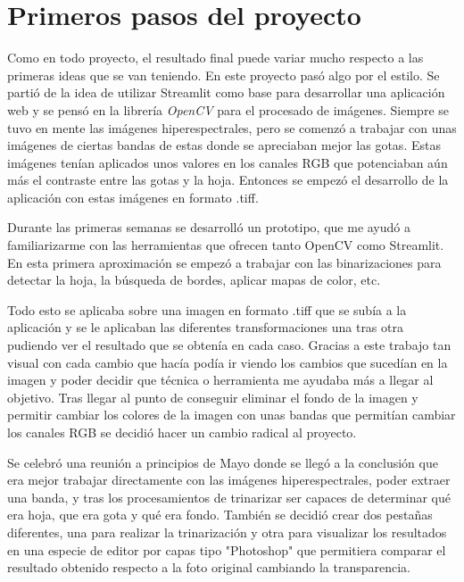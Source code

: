 
\section{Primeros pasos del proyecto}
Como en todo proyecto, el resultado final puede variar mucho respecto a las primeras ideas que se van teniendo. En este proyecto pasó algo por el estilo. Se partió de la idea de utilizar Streamlit como base para desarrollar una aplicación web y se pensó en la librería \textit{OpenCV} para el procesado de imágenes. Siempre se tuvo en mente las imágenes hiperespectrales, pero se comenzó a trabajar con unas imágenes de ciertas bandas de estas donde se apreciaban mejor las gotas. Estas imágenes tenían aplicados unos valores en los canales RGB que potenciaban aún más el contraste entre las gotas y la hoja. Entonces se empezó el desarrollo de la aplicación con estas imágenes en formato .tiff.

Durante las primeras semanas se desarrolló un prototipo, que me ayudó a familiarizarme con las herramientas que ofrecen tanto OpenCV como Streamlit. En esta primera aproximación se empezó a trabajar con las binarizaciones para detectar la hoja, la búsqueda de bordes, aplicar mapas de color, etc.

Todo esto se aplicaba sobre una imagen en formato .tiff que se subía a la aplicación y se le aplicaban las diferentes transformaciones una tras otra pudiendo ver el resultado que se obtenía en cada caso.
Gracias a este trabajo tan visual con cada cambio que hacía podía ir viendo los cambios que sucedían en la imagen y poder decidir que técnica o herramienta me ayudaba más a llegar al objetivo. Tras llegar al punto de conseguir eliminar el fondo de la imagen y permitir cambiar los colores de la imagen con unas bandas que permitían cambiar los canales RGB se decidió hacer un cambio radical al proyecto.


Se celebró una reunión a principios de Mayo donde se llegó a la conclusión que era mejor trabajar directamente con las imágenes hiperespectrales, poder extraer una banda, y tras los procesamientos de trinarizar ser capaces de determinar qué era hoja, que era gota y qué era fondo. También se decidió crear dos pestañas diferentes, una para realizar la trinarización y otra para visualizar los resultados en una especie de editor por capas tipo "Photoshop" que permitiera comparar el resultado obtenido respecto a la foto original cambiando la transparencia. 


